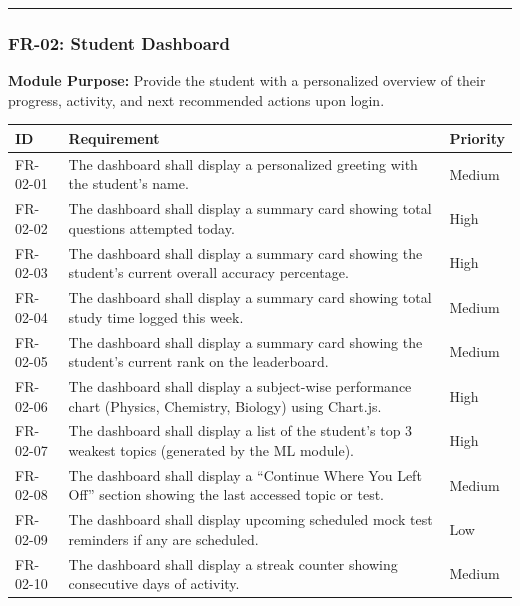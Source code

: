 \documentclass[
]{article}
\begin{document}
\begin{center}\rule{0.5\linewidth}{0.5pt}\end{center}

\subsubsection{FR-02: Student Dashboard}\label{fr-02-student-dashboard}

\textbf{Module Purpose:} Provide the student with a personalized
overview of their progress, activity, and next recommended actions upon
login.

\begin{longtable}[]{@{}
  >{\raggedright\arraybackslash}p{}
  >{\raggedright\arraybackslash}p{}
  >{\raggedright\arraybackslash}p{}@{}}
\toprule\noalign{}
\begin{minipage}[b]{\linewidth}\raggedright
ID
\end{minipage} & \begin{minipage}[b]{\linewidth}\raggedright
Requirement
\end{minipage} & \begin{minipage}[b]{\linewidth}\raggedright
Priority
\end{minipage} \\
\midrule\noalign{}
\endhead
\bottomrule\noalign{}
\endlastfoot
FR-02-01 & The dashboard shall display a personalized greeting with the
student's name. & Medium \\
FR-02-02 & The dashboard shall display a summary card showing total
questions attempted today. & High \\
FR-02-03 & The dashboard shall display a summary card showing the
student's current overall accuracy percentage. & High \\
FR-02-04 & The dashboard shall display a summary card showing total
study time logged this week. & Medium \\
FR-02-05 & The dashboard shall display a summary card showing the
student's current rank on the leaderboard. & Medium \\
FR-02-06 & The dashboard shall display a subject-wise performance chart
(Physics, Chemistry, Biology) using Chart.js. & High \\
FR-02-07 & The dashboard shall display a list of the student's top 3
weakest topics (generated by the ML module). & High \\
FR-02-08 & The dashboard shall display a ``Continue Where You Left Off''
section showing the last accessed topic or test. & Medium \\
FR-02-09 & The dashboard shall display upcoming scheduled mock test
reminders if any are scheduled. & Low \\
FR-02-10 & The dashboard shall display a streak counter showing
consecutive days of activity. & Medium \\
\end{longtable}
\end{document}
